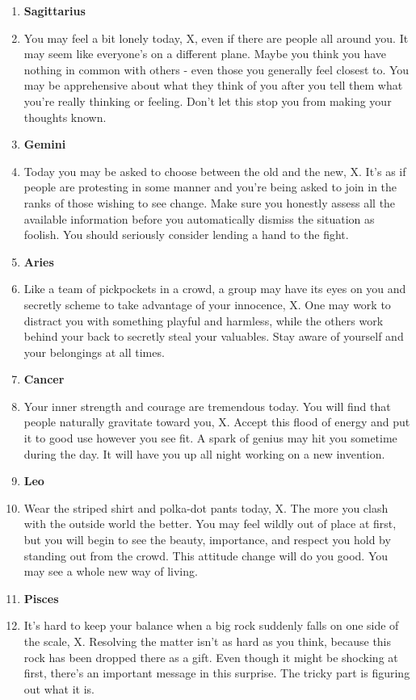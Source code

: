 \documentclass{article}[twocolumn]
\newcommand{\bb}[1]{\item[] \textbf{#1}}
\begin{document}
\begin{multicols}{2}
\begin{enumerate}
 \bb{Sagittarius}
\item You may feel a bit lonely today, X, even if there are people all around you. It may seem like everyone's on a different plane. Maybe you think you have nothing in common with others - even those you generally feel closest to. You may be apprehensive about what they think of you after you tell them what you're really thinking or feeling. Don't let this stop you from making your thoughts known.\\ 
 \bb{Gemini}
\item Today you may be asked to choose between the old and the new, X. It's as if people are protesting in some manner and you're being asked to join in the ranks of those wishing to see change. Make sure you honestly assess all the available information before you automatically dismiss the situation as foolish. You should seriously consider lending a hand to the fight. \\ 
 \bb{Aries}
\item Like a team of pickpockets in a crowd, a group may have its eyes on you and secretly scheme to take advantage of your innocence, X. One may work to distract you with something playful and harmless, while the others work behind your back to secretly steal your valuables. Stay aware of yourself and your belongings at all times.\\ 
 \bb{Cancer}
\item Your inner strength and courage are tremendous today. You will find that people naturally gravitate toward you, X. Accept this flood of energy and put it to good use however you see fit. A spark of genius may hit you sometime during the day. It will have you up all night working on a new invention.\\ 
 \bb{Leo}
\item Wear the striped shirt and polka-dot pants today, X. The more you clash with the outside world the better. You may feel wildly out of place at first, but you will begin to see the beauty, importance, and respect you hold by standing out from the crowd. This attitude change will do you good. You may see a whole new way of living.\\ 
 \bb{Pisces}
\item It's hard to keep your balance when a big rock suddenly falls on one side of the scale, X. Resolving the matter isn't as hard as you think, because this rock has been dropped there as a gift. Even though it might be shocking at first, there's an important message in this surprise. The tricky part is figuring out what it is.\\ 

\end{enumerate}
\end{multicols}
\end{document}
